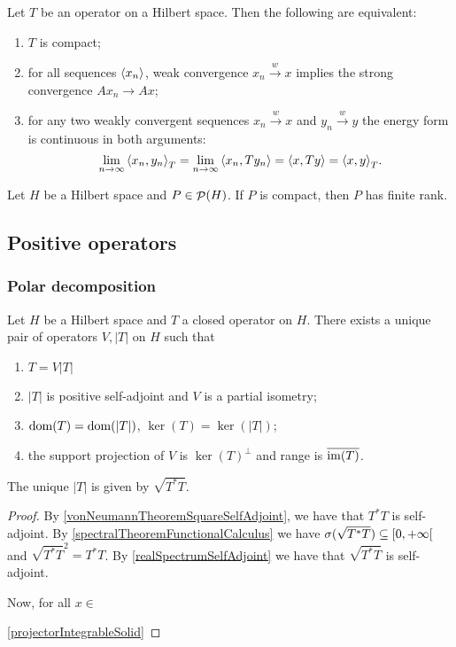 \begin{proposition}
Let $T$ be an operator on a Hilbert space. Then the following are equivalent:
\begin{enumerate}
\item $T$ is compact;
\item for all sequences $\left\langle x_n \right\rangle$, weak convergence $x_n \overset{w}{\to} x$ implies the strong convergence $Ax_n \to Ax$;
\item for any two weakly convergent sequences $x_n\overset{w}{\to} x$ and $y_n\overset{w}{\to} y$ the energy form is continuous in both arguments:
\[ \lim_{n\to\infty}\inner{x_n,y_n}_T = \lim_{n\to\infty}\inner{x_n,Ty_n} = \inner{x,Ty} = \inner{x,y}_T. \]
\end{enumerate} 
\end{proposition}

\begin{lemma}
Let $H$ be a Hilbert space and $P\in\mathop{\mathcal{P}}\nolimits(H)$. If $P$ is compact, then $P$ has finite rank.
\end{lemma}

\subsection{Positive operators}

\subsubsection{Polar decomposition}
\begin{proposition}
Let $H$ be a Hilbert space and $T$ a closed operator on $H$. There exists a unique pair of operators $V,|T|$ on $H$ such that
\begin{enumerate}
\item $T = V|T|$
\item $|T|$ is positive self-adjoint and $V$ is a partial isometry;
\item $\operatorname{dom}(T) = \operatorname{dom}(|T|)$, $\ker(T) = \ker(|T|)$;
\item the support projection of $V$ is $\ker(T)^\perp$ and range is $\overline{\operatorname{im}(T)}$.
\end{enumerate}
\end{proposition}
The unique $|T|$ is given by $\sqrt{T^*T}$.
\begin{proof}
By \ref{vonNeumannTheoremSquareSelfAdjoint}, we have that $T^*T$ is self-adjoint. By \ref{spectralTheoremFunctionalCalculus} we have $\spec(\sqrt{T^*T}) \subseteq \interval[co]{0,+\infty}$ and $\sqrt{T^*T}^2 = T^*T$. By \ref{realSpectrumSelfAdjoint} we have that $\sqrt{T^*T}$ is self-adjoint.

Now, for all $x\in $

\ref{projectorIntegrableSolid}
\end{proof}


